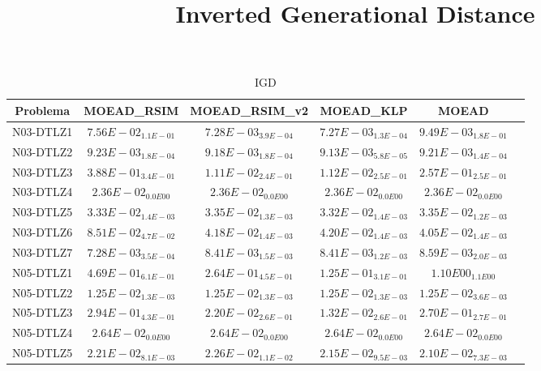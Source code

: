 \documentclass{article}
\title{Inverted Generational Distance}
\author{}
\begin{document}
\maketitle
\begin{table*}[ht!]
\scriptsize
\caption{IGD}
\centering\begin{tabular}{|c||c||c||c||c||c|} \hline
Problema &MOEAD_RSIM &MOEAD_RSIM_v2 &MOEAD_KLP &MOEAD\\\hline
N03-DTLZ1 &$7.56E-02_{1.1E-01}$ &\cellcolor{gray25}$7.28E-03_{3.9E-04}$ &\cellcolor{gray95}$7.27E-03_{1.3E-04}$ &$9.49E-03_{1.8E-01}$\\ 
\hline
N03-DTLZ2 &$9.23E-03_{1.8E-04}$ &\cellcolor{gray25}$9.18E-03_{1.8E-04}$ &\cellcolor{gray95}$9.13E-03_{5.8E-05}$ &$9.21E-03_{1.4E-04}$\\ 
\hline
N03-DTLZ3 &$3.88E-01_{3.4E-01}$ &\cellcolor{gray95}$1.11E-02_{2.4E-01}$ &\cellcolor{gray25}$1.12E-02_{2.5E-01}$ &$2.57E-01_{2.5E-01}$\\ 
\hline
N03-DTLZ4 &\cellcolor{gray95}$2.36E-02_{0.0E00}$ &\cellcolor{gray25}$2.36E-02_{0.0E00}$ &$2.36E-02_{0.0E00}$ &$2.36E-02_{0.0E00}$\\ 
\hline
N03-DTLZ5 &\cellcolor{gray25}$3.33E-02_{1.4E-03}$ &$3.35E-02_{1.3E-03}$ &\cellcolor{gray95}$3.32E-02_{1.4E-03}$ &$3.35E-02_{1.2E-03}$\\ 
\hline
N03-DTLZ6 &$8.51E-02_{4.7E-02}$ &\cellcolor{gray25}$4.18E-02_{1.4E-03}$ &$4.20E-02_{1.4E-03}$ &\cellcolor{gray95}$4.05E-02_{1.4E-03}$\\ 
\hline
N03-DTLZ7 &\cellcolor{gray95}$7.28E-03_{3.5E-04}$ &\cellcolor{gray25}$8.41E-03_{1.5E-03}$ &$8.41E-03_{1.2E-03}$ &$8.59E-03_{2.0E-03}$\\ 
\hline
N05-DTLZ1 &$4.69E-01_{6.1E-01}$ &\cellcolor{gray25}$2.64E-01_{4.5E-01}$ &\cellcolor{gray95}$1.25E-01_{3.1E-01}$ &$1.10E00_{1.1E00}$\\ 
\hline
N05-DTLZ2 &\cellcolor{gray95}$1.25E-02_{1.3E-03}$ &\cellcolor{gray25}$1.25E-02_{1.3E-03}$ &$1.25E-02_{1.3E-03}$ &$1.25E-02_{3.6E-03}$\\ 
\hline
N05-DTLZ3 &$2.94E-01_{4.3E-01}$ &\cellcolor{gray25}$2.20E-02_{2.6E-01}$ &\cellcolor{gray95}$1.32E-02_{2.6E-01}$ &$2.70E-01_{2.7E-01}$\\ 
\hline
N05-DTLZ4 &\cellcolor{gray95}$2.64E-02_{0.0E00}$ &\cellcolor{gray25}$2.64E-02_{0.0E00}$ &$2.64E-02_{0.0E00}$ &$2.64E-02_{0.0E00}$\\ 
\hline
N05-DTLZ5 &$2.21E-02_{8.1E-03}$ &$2.26E-02_{1.1E-02}$ &\cellcolor{gray25}$2.15E-02_{9.5E-03}$ &\cellcolor{gray95}$2.10E-02_{7.3E-03}$\\ 

\end{tabular}
\end{table*}
\end{document}
